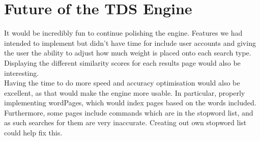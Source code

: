 \section{Future of the TDS Engine}
It would be incredibly fun to continue polishing the engine. Features we had intended to implement but didn't have time for include user accounts and giving the user the ability to adjust how much weight is placed onto each search type. Displaying the different similarity scores for each results page would also be interesting. \\
Having the time to do more speed and accuracy optimisation would also be excellent, as that would make the engine more usable. In particular, properly implementing wordPages, which would index pages based on the words included.  Furthermore, some pages include commands which are in the stopword list, and as such searches for them are very inaccurate. Creating out own stopword list could help fix this.
